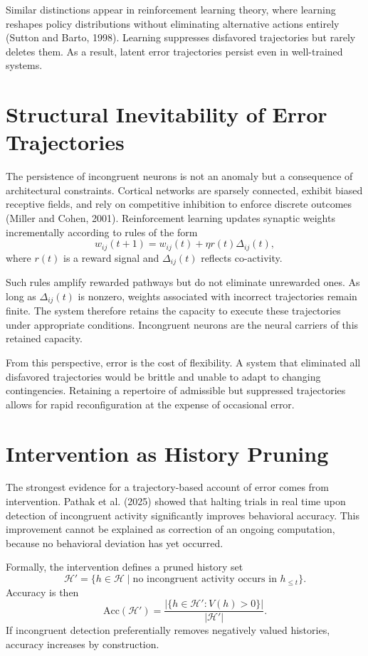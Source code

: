 \documentclass[11pt]{article}
\newcommand{\histories}{\mathcal{H}}
\newcommand{\valuation}{V}
\begin{document}
Similar distinctions appear in reinforcement learning theory, where learning reshapes policy distributions without eliminating alternative actions entirely (Sutton and Barto, 1998). Learning suppresses disfavored trajectories but rarely deletes them. As a result, latent error trajectories persist even in well-trained systems.

\section{Structural Inevitability of Error Trajectories}

The persistence of incongruent neurons is not an anomaly but a consequence of architectural constraints. Cortical networks are sparsely connected, exhibit biased receptive fields, and rely on competitive inhibition to enforce discrete outcomes (Miller and Cohen, 2001). Reinforcement learning updates synaptic weights incrementally according to rules of the form
\[
w_{ij}(t+1) = w_{ij}(t) + \eta r(t) \Delta_{ij}(t),
\]
where $r(t)$ is a reward signal and $\Delta_{ij}(t)$ reflects co-activity.

Such rules amplify rewarded pathways but do not eliminate unrewarded ones. As long as $\Delta_{ij}(t)$ is nonzero, weights associated with incorrect trajectories remain finite. The system therefore retains the capacity to execute these trajectories under appropriate conditions. Incongruent neurons are the neural carriers of this retained capacity.

From this perspective, error is the cost of flexibility. A system that eliminated all disfavored trajectories would be brittle and unable to adapt to changing contingencies. Retaining a repertoire of admissible but suppressed trajectories allows for rapid reconfiguration at the expense of occasional error.

\section{Intervention as History Pruning}

The strongest evidence for a trajectory-based account of error comes from intervention. Pathak et al. (2025) showed that halting trials in real time upon detection of incongruent activity significantly improves behavioral accuracy. This improvement cannot be explained as correction of an ongoing computation, because no behavioral deviation has yet occurred.

Formally, the intervention defines a pruned history set
\[
\histories' = \{ h \in \histories \mid \text{no incongruent activity occurs in } h_{\le t} \}.
\]
Accuracy is then
\[
\mathrm{Acc}(\histories') = \frac{|\{ h \in \histories' : \valuation(h) > 0 \}|}{|\histories'|}.
\]
If incongruent detection preferentially removes negatively valued histories, accuracy increases by construction.
\end{document}
